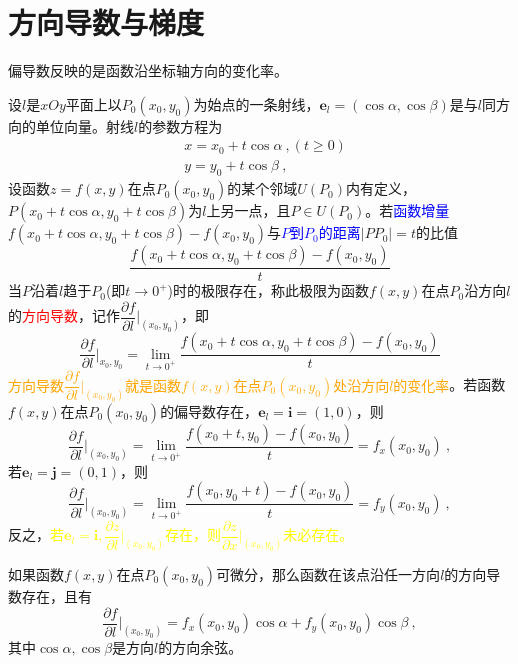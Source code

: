 \documentclass[12pt,a4paper]{article}
\renewcommand{\vec}[1]{\boldsymbol{#1}}
\begin{document}
\section{方向导数与梯度}
偏导数反映的是函数沿坐标轴方向的变化率。

设$l$是$xOy$平面上以$P_0(x_0, y_0)$为始点的一条射线，$\vec{e}_l = (\cos \alpha, \cos \beta)$是与$l$同方向的单位向量。射线$l$的参数方程为
\begin{align*}
& x = x_0 + t \cos \alpha ~, (t \geqslant 0 )\\
& y = y_0 +t \cos \beta ~, 
\end{align*}
设函数$z = f(x, y)$在点$P_0(x_0, y_0)$的某个邻域$U(P_0)$内有定义，$P(x_0 +t \cos \alpha, y_0 +t \cos \beta)$为$l$上另一点，且$P \in U(P_0)$。若\textcolor{blue}{函数增量}$f(x_0 +t\cos \alpha, y_0 +t \cos \beta) - f(x_0, y_0)$与\textcolor{blue}{$P$到$P_0$的距离}$|PP_0| = t$的比值
\begin{equation*}
\dfrac{f(x_0 +t\cos \alpha, y_0 +t \cos \beta) - f(x_0, y_0)}{t}
\end{equation*}
当$P$沿着$l$趋于$P_0$(即$t \rightarrow 0^+$)时的极限存在，称此极限为函数$f(x, y)$在点$P_0$沿方向$l$的\textcolor{red}{方向导数}，记作$\dfrac{\partial f}{\partial l} \Bigg|_{(x_0, y_0)}$，即
\begin{equation}
\dfrac{\partial f}{\partial l} \Bigg|_{x_0, y_0} = \lim_{t \rightarrow 0^+} \dfrac{f(x_0 +t\cos \alpha, y_0 +t \cos \beta) - f(x_0, y_0)}{t}
\end{equation}
\textcolor{orange}{方向导数$\dfrac{\partial f}{\partial l} \Bigg|_{(x_0, y_0)}$就是函数$f(x, y)$在点$P_0(x_0, y_0)$处沿方向$l$的变化率}。若函数$f(x, y)$在点$P_0(x_0, y_0)$的偏导数存在，$\vec{e}_l = \vec{i} = (1, 0)$，则
\begin{equation*}
\dfrac{\partial f}{\partial l} \Bigg|_{(x_0, y_0)} = \lim_{t \rightarrow 0^+} \dfrac{f(x_0 +t, y_0) - f(x_0, y_0)}{t} = f_x(x_0, y_0) ~,
\end{equation*}
若$\vec{e}_l = \vec{j} = (0, 1)$，则
\begin{equation*}
\dfrac{\partial f}{\partial l} \Bigg|_{(x_0, y_0)} = \lim_{t \rightarrow 0^+} \dfrac{f(x_0, y_0 +t) - f(x_0, y_0)}{t} = f_y(x_0, y_0) ~,
\end{equation*}
反之，\textcolor{yellow}{若$\vec{e}_l = \vec{i}, \dfrac{\partial z}{\partial l} \Bigg|_{(x_0, y_0)}$存在，则$\dfrac{\partial z}{\partial x} \Bigg|_{(x_0, y_0)}$未必存在。}


\begin{tcolorbox}[colback=green!15,colframe=green!40!black,title= 定理]
如果函数$f(x,y)$在点$P_0(x_0, y_0)$可微分，那么函数在该点沿任一方向$l$的方向导数存在，且有
\begin{equation}
\dfrac{\partial f}{\partial l} \Bigg|_{(x_0, y_0)} = f_x (x_0, y_0) \cos \alpha +f_y (x_0, y_0) \cos \beta ~,
\end{equation}
其中$\cos \alpha, \cos \beta$是方向$l$的方向余弦。
\end{tcolorbox}
\end{document}
